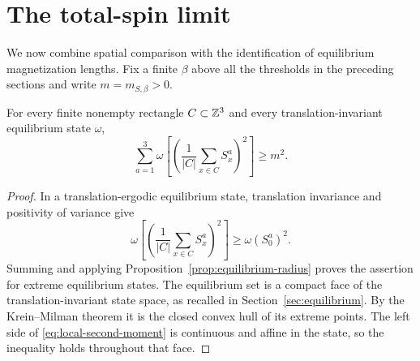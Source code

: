 \section{The total-spin limit}\label{sec:global-spin}

We now combine spatial comparison with the identification of equilibrium
magnetization lengths. Fix a finite $\beta$ above all the thresholds in
the preceding sections and write $m=m_{S,\beta}>0$.

\begin{lemma}\label{lem:local-second-moment}
For every finite nonempty rectangle $C\subset\mathbb Z^3$ and every
translation-invariant equilibrium state $\omega$,
\begin{equation}\label{eq:local-second-moment}
 \sum_{a=1}^3\omega\!\left[
       \left(\frac1{|C|}\sum_{x\in C}S_x^a\right)^2\right]\ge m^2.
\end{equation}
\end{lemma}
\begin{proof}
In a translation-ergodic equilibrium state, translation invariance and
positivity of variance give
\[
 \omega\!\left[
       \left(\frac1{|C|}\sum_{x\in C}S_x^a\right)^2\right]
    \ge\omega(S_0^a)^2.
\]
Summing and applying Proposition~\ref{prop:equilibrium-radius} proves
the assertion for extreme equilibrium states. The equilibrium set is
a compact face of the translation-invariant state space, as recalled in
Section~\ref{sec:equilibrium}. By the Krein--Milman theorem it is the
closed convex hull of its extreme points. The left side of
\eqref{eq:local-second-moment} is continuous and affine in the state,
so the inequality holds throughout that face.
\end{proof}


